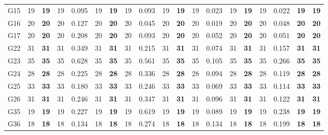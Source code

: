 \documentclass[12pt, a4paper]{article}%
\numberwithin{equation}{section}
\theoremstyle{plain}
\begin{document}
{\begin{landscape}
\begin{longtable}{lllllllllllllllllll}
						G15                       & 19   & \textbf{19}  & 19  & 0.095  & 19   & \textbf{19}  & 19  & 0.093 & 19   & \textbf{19}  & 19  & 0.023  & 19   & \textbf{19}  & 19  & 0.022 & \textbf{19}             & \textbf{19}          \\
						G16                       & 20   & \textbf{20}  & 20  & 0.127  & 20   & \textbf{20}  & 20  & 0.045 & 20   & \textbf{20}  & 20  & 0.019  & 20   & \textbf{20}  & 20  & 0.048 & \textbf{20}             & \textbf{20}          \\
						G17                       & 20   & \textbf{20}  & 20  & 0.208  & 20   & \textbf{20}  & 20  & 0.093 & 20   & \textbf{20}  & 20  & 0.052  & 20   & \textbf{20}  & 20  & 0.051 & \textbf{20}             & \textbf{20}          \\
						G22                       & 31   & \textbf{31}  & 31  & 0.349  & 31   & \textbf{31}  & 31  & 0.215 & 31   & \textbf{31}  & 31  & 0.074  & 31   & \textbf{31}  & 31  & 0.157 & \textbf{31}             & \textbf{31}          \\
						G23                       & 35   & \textbf{35}  & 35  & 0.628  & 35   & \textbf{35}  & 35  & 0.561 & 35   & \textbf{35}  & 35  & 0.105  & 35   & \textbf{35}  & 35  & 0.266 & \textbf{35}             & \textbf{35}          \\
						G24                       & 28   & \textbf{28}  & 28  & 0.225  & 28   & \textbf{28}  & 28  & 0.336 & 28   & \textbf{28}  & 28  & 0.094  & 28   & \textbf{28}  & 28  & 0.119 & \textbf{28}             & \textbf{28}          \\
						G25                       & 33   & \textbf{33}  & 33  & 0.180  & 33   & \textbf{33}  & 33  & 0.246 & 33   & \textbf{33}  & 33  & 0.069  & 33   & \textbf{33}  & 33  & 0.114 & \textbf{33}             & \textbf{33}          \\
						G26                       & 31   & \textbf{31}  & 31  & 0.246  & 31   & \textbf{31}  & 31  & 0.347 & 31   & \textbf{31}  & 31  & 0.096  & 31   & \textbf{31}  & 31  & 0.122 & \textbf{31}             & \textbf{31}          \\
						G35                       & 19   & \textbf{19}  & 19  & 0.227  & 19   & \textbf{19}  & 19  & 0.619 & 19   & \textbf{19}  & 19  & 0.089  & 19   & \textbf{19}  & 19  & 0.238 & \textbf{19}             & \textbf{19}          \\
						G36                       & 18   & \textbf{18}  & 18  & 0.134  & 18   & \textbf{18}  & 18  & 0.274 & 18   & \textbf{18}  & 18  & 0.134  & 18   & \textbf{18}  & 18  & 0.199 & \textbf{18}             & \textbf{18}          \\

\end{longtable}
\end{landscape}}
\end{document}
